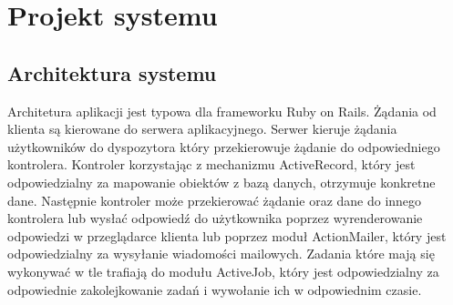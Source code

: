 \chapter{Projekt systemu}
\label{cha:analizaAplikacji}

\section{Architektura systemu}
\label{sec:architektura}
Architetura aplikacji jest typowa dla frameworku Ruby on Rails. Żądania od klienta są kierowane do serwera aplikacyjnego. Serwer kieruje żądania użytkowników do dyspozytora który przekierowuje żądanie do odpowiedniego kontrolera. Kontroler korzystając z mechanizmu ActiveRecord, który jest odpowiedzialny za mapowanie obiektów z bazą danych, otrzymuje konkretne dane. Następnie kontroler może przekierować żądanie oraz dane do innego kontrolera lub wysłać odpowiedź do użytkownika poprzez wyrenderowanie odpowiedzi w przeglądarce klienta lub poprzez moduł ActionMailer, który jest odpowiedzialny za wysyłanie wiadomości mailowych. Zadania które mają się wykonywać w tle trafiają do modułu ActiveJob, który jest odpowiedzialny za odpowiednie zakolejkowanie zadań i wywołanie ich w odpowiednim czasie.
\noindent
\begin{minipage}{\linewidth}
\label{use-case}
\end{minipage}

